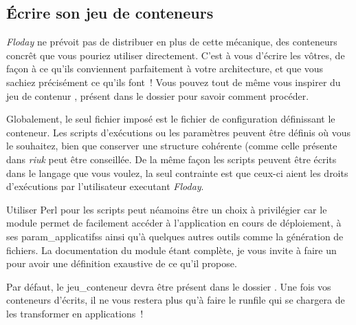 \subsection{Écrire son jeu de conteneurs}

\emph{Floday} ne prévoit pas de distribuer en plus de cette mécanique, des conteneurs concrêt que vous pouriez utiliser directement.
C'est à vous d'écrire les vôtres, de façon à ce qu'ils conviennent parfaitement à votre architecture, et que vous sachiez précisément ce qu'ils font~!
Vous pouvez tout de même vous inspirer du jeu de contenur , présent dans le dossier  pour savoir comment procéder.

Globalement, le seul fichier imposé est le fichier de configuration définissant le conteneur.
Les scripts d'exécutions ou les paramètres peuvent être définis où vous le souhaitez, bien que conserver une structure cohérente (comme celle présente dans \emph{riuk} peut être conseillée.
De la même façon les scripts peuvent être écrits dans le langage que vous voulez, la seul contrainte est que ceux-ci aient les droits d'exécutions par l'utilisateur executant \emph{Floday}.

Utiliser Perl pour les scripts peut néamoins être un choix à privilégier car le module  permet de facilement accéder à l'\gls{application} en cours de déploiement, à ses \glspl{param_applicatifs} ainsi qu'à quelques autres outils comme la génération de fichiers.
La documentation du module étant complète, je vous invite à faire un  pour avoir une définition exaustive de ce qu'il propose.

Par défaut, le \gls{jeu_conteneur} devra être présent dans le dossier .
Une fois vos conteneurs d'écrits, il ne vous restera plus qu'à faire le \gls{runfile} qui se chargera de les transformer en applications~!
